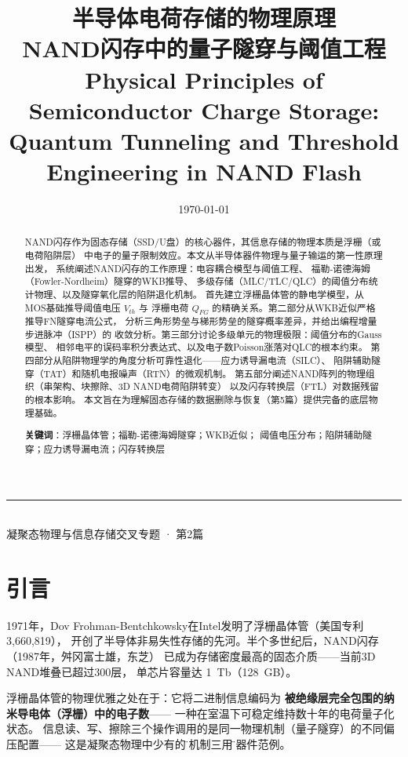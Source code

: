 \documentclass[11pt,a4paper,twoside]{article}
\title{
  {\Huge\bfseries 半导体电荷存储的物理原理} \\[8pt]
  {\Large NAND闪存中的量子隧穿与阈值工程} \\[12pt]
  {\normalsize Physical Principles of Semiconductor Charge Storage: \\
   Quantum Tunneling and Threshold Engineering in NAND Flash}
}
\author{}
\date{\today}
\theoremstyle{definition}
\theoremstyle{plain}
\theoremstyle{remark}
\begin{document}
\maketitle

\begin{center}
\rule{0.8\textwidth}{0.5pt} \\[8pt]
{\small 凝聚态物理与信息存储交叉专题 · 第2篇} \\[4pt]
\end{center}

\begin{abstract}
\noindent
NAND闪存作为固态存储（SSD/U盘）的核心器件，其信息存储的物理本质是浮栅（或电荷陷阱层）
中电子的量子限制效应。本文从半导体器件物理与量子输运的第一性原理出发，
系统阐述NAND闪存的工作原理：电容耦合模型与阈值工程、
福勒-诺德海姆（Fowler-Nordheim）隧穿的WKB推导、
多级存储（MLC/TLC/QLC）的阈值分布统计物理、以及隧穿氧化层的陷阱退化机制。
首先建立浮栅晶体管的静电学模型，从MOS基础推导阈值电压 $V_{th}$ 与
浮栅电荷 $Q_{FG}$ 的精确关系。第二部分从WKB近似严格推导FN隧穿电流公式，
分析三角形势垒与梯形势垒的隧穿概率差异，并给出编程增量步进脉冲（ISPP）的
收敛分析。第三部分讨论多级单元的物理极限：阈值分布的Gauss模型、
相邻电平的误码率积分表达式、以及电子数Poisson涨落对QLC的根本约束。
第四部分从陷阱物理学的角度分析可靠性退化——应力诱导漏电流（SILC）、
陷阱辅助隧穿（TAT）和随机电报噪声（RTN）的微观机制。
第五部分阐述NAND阵列的物理组织（串架构、块擦除、3D NAND电荷陷阱转变）
以及闪存转换层（FTL）对数据残留的根本影响。
本文旨在为理解固态存储的数据删除与恢复（第5篇）提供完备的底层物理基础。

\medskip
\noindent\textbf{关键词}：浮栅晶体管；福勒-诺德海姆隧穿；WKB近似；
阈值电压分布；陷阱辅助隧穿；应力诱导漏电流；闪存转换层
\end{abstract}

\tableofcontents
\newpage

\section{引言}
\label{sec:intro}

1971年，Dov Frohman-Bentchkowsky在Intel发明了浮栅晶体管（美国专利3,660,819），
开创了半导体非易失性存储的先河。半个多世纪后，NAND闪存（1987年，舛冈富士雄，东芝）
已成为存储密度最高的固态介质——当前3D NAND堆叠已超过300层，
单芯片容量达 \SI{1}{Tb}（\SI{128}{GB}）。

浮栅晶体管的物理优雅之处在于：它将二进制信息编码为
\textbf{被绝缘层完全包围的纳米导电体（浮栅）中的电子数}——
一种在室温下可稳定维持数十年的电荷量子化状态。
信息读、写、擦除三个操作调用的是同一物理机制（量子隧穿）的不同偏压配置——
这是凝聚态物理中少有的\"一机制三用\"的器件范例。
\end{document}

